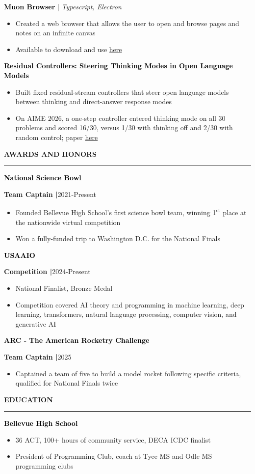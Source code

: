 \documentclass[8pt,a4paper]{altacv}
\newcommand{\resumebodysize}{\fontsize{8pt}{9pt}\selectfont}
\renewcommand{\divider}{\textcolor{body!30}{\hdashrule{\linewidth}{0.6pt}{0.285em}}\vspace{4.096pt}}
\renewcommand{\cvsection}[2][]{%
  \bigskip%
  \vspace{3.686pt}%
  \ifstrequal{#1}{}{}{\marginpar{\vspace*{\dimexpr1pt-\baselineskip}\raggedright}}%
  {\color{heading}\large\bfseries\MakeUppercase{#2}}\\[-1ex]\vspace{1.489pt}%
  {\color{heading}\rule{\linewidth}{2pt}\par}\medskip\vspace{1.179pt}
}
\renewcommand{\cvevent}[4]{%
  {\fontsize{9pt}{9pt}\selectfont\color{black}\hspace*{-0.282pt}#1\par}
  \ifstrequal{#2}{}{}{%
    \vspace{2.144pt}
    {\fontsize{9pt}{9pt}\selectfont\textbf{\color{accent}#2}\hspace{0.5em}\resumebodysize\faCalendar\hspace{0.5em}#3\par}%
  }%
  \vspace{2.145pt}\resumebodysize
}
\begin{document}
\cvevent{\textcolor{black}{\textbf{Muon Browser}} \textnormal{| \textit{Typescript, Electron}}}{}{}{}
\begin{itemize}
\item Created a web browser that allows the user to open and browse pages and notes on an infinite canvas
\item Available to download and use \href{http://github.com/oof-baroomf/muon}{here}
\end{itemize}
\divider

\cvevent{\textcolor{black}{\textbf{Residual Controllers: Steering Thinking Modes in Open Language Models}}}{}{}{}
\begin{itemize}
\item Built fixed residual-stream controllers that steer open language models between thinking and direct-answer response modes
\item On AIME 2026, a one-step controller entered thinking mode on all 30 problems and scored 16/30, versus 1/30 with thinking off and 2/30 with random control; paper \href{https://cdn.jsdelivr.net/gh/dhruv9saini/residual-controllers@master/paper/main.pdf}{here}
\end{itemize}

\vskip-4.273pt
\cvsection{Awards and Honors}
\vskip0.464pt

\cvevent{\textcolor{black}{\textbf{National Science Bowl}}}{\textnormal{Team Captain |}}{2021-Present}{}
\begin{itemize}
\item Founded Bellevue High School’s first science bowl team, winning 1\textsuperscript{st} place at the nationwide virtual competition
\item Won a fully-funded trip to Washington D.C. for the National Finals
\end{itemize}
\divider

\cvevent{\textcolor{black}{\textbf{USAAIO}}}{\textnormal{Competition |}}{2024-Present}{}
\begin{itemize}
\item National Finalist, Bronze Medal
\item Competition covered AI theory and programming in machine learning, deep learning, transformers, natural language processing, computer vision, and generative AI
\end{itemize}
\divider

\cvevent{\textcolor{black}{\textbf{ARC - The American Rocketry Challenge}}}{\textnormal{Team Captain |}}{2025}{}
\begin{itemize}
\item Captained a team of five to build a model rocket following specific criteria, qualified for National Finals twice
\end{itemize}

\vskip-3.343pt
\cvsection{Education}
\vskip-1.479pt

\cvevent{\textcolor{black}{\textbf{Bellevue High School}}}{}{}{}
\begin{itemize}
\item 36 ACT, 100+ hours of community service, DECA ICDC finalist
\item President of Programming Club, coach at Tyee MS and Odle MS programming clubs
\end{itemize}
\end{document}
